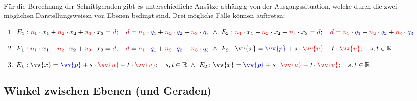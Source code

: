        \paragraph{} Für die Berechnung der Schnittgeraden gibt es unterschiedliche Ansätze abhängig von der
        Ausgangssituation, welche durch die zwei möglichen Darstellungsweisen von Ebenen bedingt sind. Drei mögliche
        Fälle können auftreten:
        \begin{enumerate}[1)]
            \item $E_1:\textcolor{red}{n_1} \cdot x_1 + \textcolor{red}{n_2} \cdot x_2 + \textcolor{red}{n_3} \cdot x_3 = \textcolor{purple}{d} ; \quad \textcolor{purple}{d} = \textcolor{red}{n_1} \cdot \textcolor{blue}{q_1} + \textcolor{red}{n_2} \cdot \textcolor{blue}{q_2} + \textcolor{red}{n_3} \cdot \textcolor{blue}{q_3} \text{ } \land \text{ } E_2:\textcolor{red}{n_1} \cdot x_1 + \textcolor{red}{n_2} \cdot x_2 + \textcolor{red}{n_3} \cdot x_3 = \textcolor{purple}{d} ; \quad \textcolor{purple}{d} = \textcolor{red}{n_1} \cdot \textcolor{blue}{q_1} + \textcolor{red}{n_2} \cdot \textcolor{blue}{q_2} + \textcolor{red}{n_3} \cdot \textcolor{blue}{q_3}$
            \item $E_1:\textcolor{red}{n_1} \cdot x_1 + \textcolor{red}{n_2} \cdot x_2 + \textcolor{red}{n_3} \cdot x_3 = \textcolor{purple}{d} ; \quad \textcolor{purple}{d} = \textcolor{red}{n_1} \cdot \textcolor{blue}{q_1} + \textcolor{red}{n_2} \cdot \textcolor{blue}{q_2} + \textcolor{red}{n_3} \cdot \textcolor{blue}{q_3} \text{ } \land \text{ } E_2:\vv{x}=\textcolor{blue}{\vv{p}} + s\cdot \textcolor{red}{\vv{u}} + t\cdot \textcolor{red}{\vv{v}};\quad s,t\in\R$
            \item $E_1:\vv{x}=\textcolor{blue}{\vv{p}} + s\cdot \textcolor{red}{\vv{u}} + t\cdot \textcolor{red}{\vv{v}};\quad s,t\in\R \text{ } \land \text{ } E_2:\vv{x}=\textcolor{blue}{\vv{p}} + s\cdot \textcolor{red}{\vv{u}} + t\cdot \textcolor{red}{\vv{v}};\quad s,t\in\R$
        \end{enumerate}


    \subsection{Winkel zwischen Ebenen (und Geraden)}


